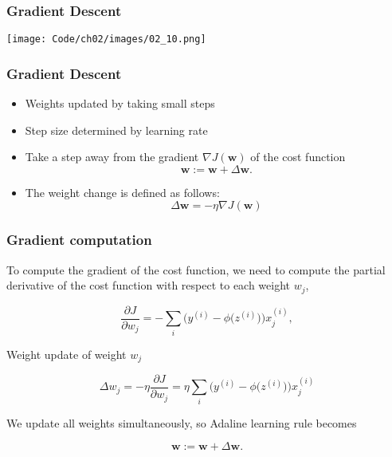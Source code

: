 \documentclass{beamer}
\begin{document}
\begin{frame}
  \frametitle{Gradient Descent}
  \texttt{[image: Code/ch02/images/02\_10.png]}
\end{frame}

\begin{frame}
  \frametitle{Gradient Descent}
  \begin{itemize}
  \item Weights updated by taking small steps
  \item Step size determined by learning rate
  \item Take a step away from the gradient $\nabla J(\mathbf{w})$ of the cost function
    \[
    \mathbf{w} := \mathbf{w} + \Delta \mathbf{w}.
    \]
  \item The weight change is defined as follows:
    \[
    \Delta \mathbf{w} = - \eta \nabla J(\mathbf{w})
    \]
  \end{itemize}
\end{frame}

\begin{frame}
  \frametitle{Gradient computation}
  To compute the gradient of the cost function, we need to compute the partial derivative of the cost function with respect to each weight $w_j$,

  \[
  \frac{\partial J}{\partial w_j} = - \sum_i \bigg( y^{(i)} - \phi \big(z^{(i)} \big) \bigg) x_{j}^{(i)}, 
  \]

  Weight update of weight $w_j$

  \[
  \Delta w_j = - \eta \frac{\partial J}{\partial w_j} = \eta  \sum_i \bigg( y^{(i)} - \phi \big(z^{(i)} \big) \bigg) x_{j}^{(i)}
  \]

  We update all weights simultaneously, so Adaline learning rule becomes

  \[
  \mathbf{w} := \mathbf{w} + \Delta \mathbf{w}.
  \]
\end{frame}
\end{document}
